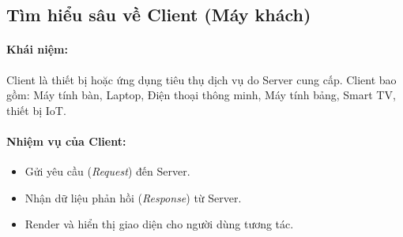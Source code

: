 \subsection{Tìm hiểu sâu về Client (Máy khách)}

\paragraph{Khái niệm:} Client là thiết bị hoặc ứng dụng tiêu thụ dịch vụ do Server cung cấp. Client bao gồm: Máy tính bàn, Laptop, Điện thoại thông minh, Máy tính bảng, Smart TV, thiết bị IoT.

\paragraph{Nhiệm vụ của Client:}
\begin{itemize}
    \item Gửi yêu cầu (\textit{Request}) đến Server.
    \item Nhận dữ liệu phản hồi (\textit{Response}) từ Server.
    \item Render và hiển thị giao diện cho người dùng tương tác.
\end{itemize}

